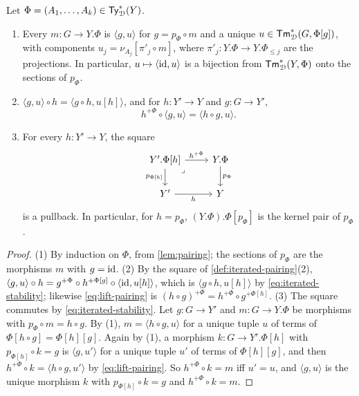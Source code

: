 \begin{lemma}\label{lem:iterated-pairing}
    Let $\Phi = (A_1, \ldots, A_k) \in \mathsf{Ty}^*_{\mathcal{D}}(Y)$.
    \begin{enumerate}
        \item Every $m : G \to Y.\Phi$ is $\langle g, u \rangle$ for $g = p_\Phi \circ m$ and a unique $u \in \mathsf{Tm}^*_{\mathcal{D}}(G, \Phi[g])$, with components $u_j = \nu_{A_j}[\pi'_j \circ m]$, where $\pi'_j : Y.\Phi \to Y.\Phi_{\leq j}$ are the projections. In particular, $u \mapsto \langle \mathrm{id}, u \rangle$ is a bijection from $\mathsf{Tm}^*_{\mathcal{D}}(Y, \Phi)$ onto the sections of $p_\Phi$.
        \item $\langle g, u \rangle \circ h = \langle g \circ h, u[h] \rangle$, and for $h : Y' \to Y$ and $g : G \to Y'$,
        \begin{equation}\label{eq:lift-pairing}
            h^{+\Phi} \circ \langle g, u \rangle = \langle h \circ g, u \rangle.
        \end{equation}
        \item For every $h : Y' \to Y$, the square
        \[\begin{tikzcd}
            {Y'.\Phi[h]} & {Y.\Phi} \\
            {Y'} & Y
            \arrow["{h^{+\Phi}}", from=1-1, to=1-2]
            \arrow["{p_{\Phi[h]}}"', from=1-1, to=2-1]
            \arrow["\lrcorner"{anchor=center, pos=0.125}, draw=none, from=1-1, to=2-2]
            \arrow["{p_\Phi}", from=1-2, to=2-2]
            \arrow["h"', from=2-1, to=2-2]
        \end{tikzcd}\]
        is a pullback. In particular, for $h = p_\Phi$, $(Y.\Phi).\Phi[p_\Phi]$ is the kernel pair of $p_\Phi$.
    \end{enumerate}
\end{lemma}

\begin{proof}
    (1) By induction on $\Phi$, from \cref{lem:pairing}; the sections of $p_\Phi$ are the morphisms $m$ with $g = \mathrm{id}$. (2) By the square of \cref{def:iterated-pairing}(2), $\langle g, u \rangle \circ h = g^{+\Phi} \circ h^{+\Phi[g]} \circ \langle \mathrm{id}, u[h] \rangle$, which is $\langle g \circ h, u[h] \rangle$ by \eqref{eq:iterated-stability}; likewise \eqref{eq:lift-pairing} is $(h \circ g)^{+\Phi} = h^{+\Phi} \circ g^{+\Phi[h]}$. (3) The square commutes by \eqref{eq:iterated-stability}. Let $g : G \to Y'$ and $m : G \to Y.\Phi$ be morphisms with $p_\Phi \circ m = h \circ g$. By (1), $m = \langle h \circ g, u \rangle$ for a unique tuple $u$ of terms of $\Phi[h \circ g] = \Phi[h][g]$. Again by (1), a morphism $k : G \to Y'.\Phi[h]$ with $p_{\Phi[h]} \circ k = g$ is $\langle g, u' \rangle$ for a unique tuple $u'$ of terms of $\Phi[h][g]$, and then $h^{+\Phi} \circ k = \langle h \circ g, u' \rangle$ by \eqref{eq:lift-pairing}. So $h^{+\Phi} \circ k = m$ iff $u' = u$, and $\langle g, u \rangle$ is the unique morphism $k$ with $p_{\Phi[h]} \circ k = g$ and $h^{+\Phi} \circ k = m$.
\end{proof}


